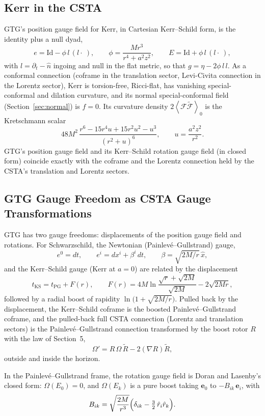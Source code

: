 \documentclass[11pt,a4paper]{article}
\newcommand{\F}{\mathcal{F}}
\newcommand{\Om}{\Omega}
\newcommand{\e}{\mathbf{e}}
\newcommand{\rev}[1]{\widetilde{#1}}
\newcommand{\grade}[2]{\left\langle #1\right\rangle_{#2}}
\begin{document}
\subsection{Kerr in the CSTA}

GTG's position gauge field for Kerr, in Cartesian Kerr--Schild form,
is the identity plus a null dyad,
\[
    e=\mathrm{Id}-\phi\,l\,(l\cdot\ ),
    \qquad
    \phi=\frac{Mr^3}{r^4+a^2z^2},
    \qquad
    E=\mathrm{Id}+\phi\,l\,(l\cdot\ ),
\]
with \(l=\partial_t-\hat n\) ingoing and null in the flat metric, so
that \(g=\eta-2\phi\,l\,l\). As a conformal connection (coframe in the
translation sector, Levi-Civita connection in the Lorentz sector),
Kerr is torsion-free, Ricci-flat, has vanishing special-conformal and
dilation curvature, and its normal special-conformal field
(Section~\ref{sec:normal}) is \(f=0\). Its curvature density
\(2\grade{\F\rev\F}{0}\) is the Kretschmann scalar
\[
    48M^2\,\frac{r^6-15r^4u+15r^2u^2-u^3}{(r^2+u)^6},
    \qquad
    u=\frac{a^2z^2}{r^2}.
\]
GTG's position gauge field and its Kerr--Schild rotation gauge field
(in closed form) coincide exactly with the coframe and the Lorentz
connection held by the CSTA's translation and Lorentz sectors.

\subsection{GTG Gauge Freedom as CSTA Gauge Transformations}

GTG has two gauge freedoms: displacements of the position gauge field
and rotations. For Schwarzschild, the Newtonian
(Painlev\'e--Gullstrand) gauge,
\[
    e^0=dt,\qquad e^i=dx^i+\beta^i\,dt,\qquad
    \beta=\sqrt{2M/r}\,\hat x,
\]
and the Kerr--Schild gauge (Kerr at \(a=0\)) are related by the
displacement
\[
    t_{\mathrm{KS}}=t_{\mathrm{PG}}+F(r),\qquad
    F(r)=4M\ln\frac{\sqrt r+\sqrt{2M}}{\sqrt{2M}}-2\sqrt{2Mr},
\]
followed by a radial boost of rapidity \(\ln\bigl(1+\sqrt{2M/r}\bigr)\).
Pulled back by the displacement, the Kerr--Schild coframe is the
boosted Painlev\'e--Gullstrand coframe, and the pulled-back full CSTA
connection (Lorentz and translation sectors) is the
Painlev\'e--Gullstrand connection transformed by the boost rotor \(R\)
with the law of Section~5,
\[
    \Om'=R\,\Om\,\rev R-2(\nabla R)\rev R,
\]
outside and inside the horizon.

In the Painlev\'e--Gullstrand frame, the rotation gauge field is Doran
and Lasenby's closed form: \(\Om(E_0)=0\), and \(\Om(E_k)\) is a pure
boost taking \(\e_0\) to \(-B_{ik}\,\e_i\), with
\[
    B_{ik}=\sqrt{\frac{2M}{r^3}}\Bigl(\delta_{ik}
    -\tfrac32\,\hat r_i\hat r_k\Bigr).
\]
\end{document}
